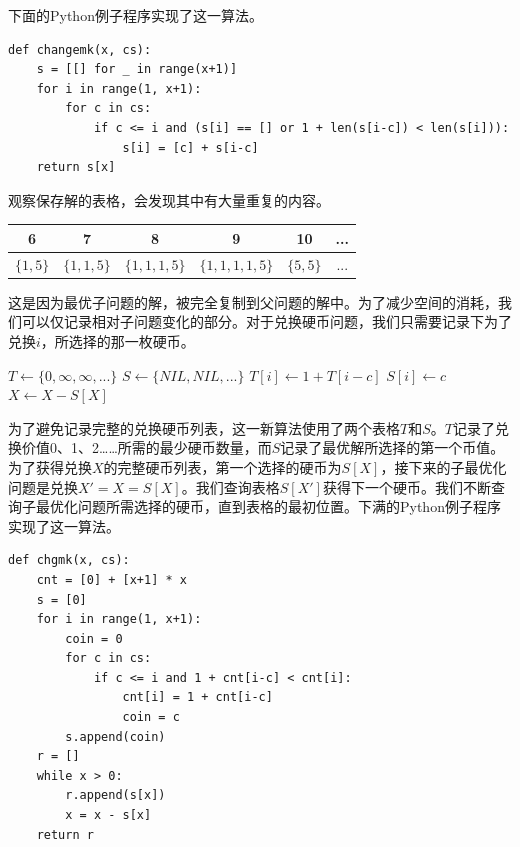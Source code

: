 \documentclass[UTF8]{article}
\begin{document}
下面的Python例子程序实现了这一算法。

\lstset{language=Python}
\begin{lstlisting}
def changemk(x, cs):
    s = [[] for _ in range(x+1)]
    for i in range(1, x+1):
        for c in cs:
            if c <= i and (s[i] == [] or 1 + len(s[i-c]) < len(s[i])):
                s[i] = [c] + s[i-c]
    return s[x]
\end{lstlisting}

观察保存解的表格，会发现其中有大量重复的内容。

\begin{tabular}{|c|c|c|c|c|c|}
\hline
6 & 7 & 8 & 9 & 10 & ... \\
\hline
$\{ 1, 5 \}$ & $\{1, 1, 5\}$ & $\{1, 1, 1, 5\}$ & $\{1, 1, 1, 1, 5\}$ & $\{ 5, 5 \}$ & ... \\
\hline
\end{tabular}

这是因为最优子问题的解，被完全复制到父问题的解中。为了减少空间的消耗，我们可以仅记录相对子问题变化的部分。对于兑换硬币问题，我们只需要记录下为了兑换$i$，所选择的那一枚硬币。

\begin{algorithmic}[1]
  \State $T \gets \{ 0, \infty, \infty, ... \}$
  \State $S \gets \{ NIL, NIL, ... \}$
        \State $T[i] \gets 1 + T[i-c]$
        \State $S[i] \gets c$
      \EndIf
    \EndFor
  \EndFor
    \State {}
    \State $X \gets X - S[X]$
  \EndWhile
\EndFunction
\end{algorithmic}

为了避免记录完整的兑换硬币列表，这一新算法使用了两个表格$T$和$S$。$T$记录了兑换价值0、1、2……所需的最少硬币数量，而$S$记录了最优解所选择的第一个币值。为了获得兑换$X$的完整硬币列表，第一个选择的硬币为$S[X]$，接下来的子最优化问题是兑换$X' = X = S[X]$。我们查询表格$S[X']$获得下一个硬币。我们不断查询子最优化问题所需选择的硬币，直到表格的最初位置。下满的Python例子程序实现了这一算法。

\lstset{language=Python}
\begin{lstlisting}
def chgmk(x, cs):
    cnt = [0] + [x+1] * x
    s = [0]
    for i in range(1, x+1):
        coin = 0
        for c in cs:
            if c <= i and 1 + cnt[i-c] < cnt[i]:
                cnt[i] = 1 + cnt[i-c]
                coin = c
        s.append(coin)
    r = []
    while x > 0:
        r.append(s[x])
        x = x - s[x]
    return r
\end{lstlisting}
\end{document}
